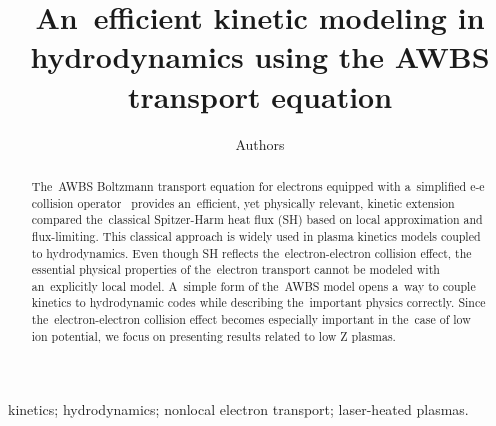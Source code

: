 \documentclass[preprint,12pt]{elsarticle}
\begin{document}
\begin{frontmatter}



\title{An~efficient kinetic modeling in hydrodynamics using the AWBS transport equation}


\author[a,b]{Authors}

\address[a]{Centre Lasers Intenses et Applications, Universite de Bordeaux-CNRS-CEA, UMR 5107, F-33405 Talence, France}

\begin{abstract}
The~AWBS Boltzmann transport equation for electrons equipped with 
a~simplified e-e collision operator~\cite{AWBS_PRL1986}
provides an~efficient, yet physically 
relevant, kinetic extension compared the~classical 
Spitzer-Harm heat flux (SH)
based on local approximation and flux-limiting.
This classical approach is widely used in plasma
kinetics models coupled to hydrodynamics. 
Even though SH reflects the~electron-electron collision effect, 
the essential physical properties
of the~electron transport cannot be modeled with 
an~explicitly local model. A~simple form of the~AWBS model opens a~way 
to couple kinetics to hydrodynamic codes while describing the~important 
physics correctly. Since the~electron-electron collision effect becomes 
especially important in the~case of low ion potential, we focus on presenting 
results related to low Z plasmas.
\end{abstract}

\begin{keyword}
kinetics; hydrodynamics; nonlocal electron transport; laser-heated plasmas.

\end{keyword}

\end{frontmatter}
\end{document}
